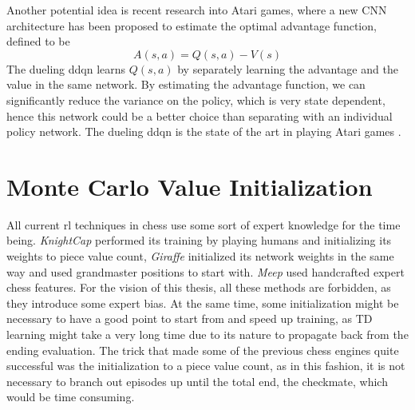 Another potential idea is recent research into Atari games, where a new CNN architecture has been proposed to estimate the optimal advantage function, defined to be
\begin{equation}
A(s,a)=Q(s,a)-V(s)
\end{equation}
The dueling \gls{ddqn} learns $Q(s,a)$ by separately learning the advantage and the value in the same network. By estimating the advantage function, we can significantly reduce the variance on the policy, which is very state dependent, hence this network could be a better choice than separating with an individual policy network. The dueling \gls{ddqn} is the state of the art in playing Atari games \cite{dddqn15}.

\section{Monte Carlo Value Initialization}

All current \gls{rl} techniques in chess use some sort of expert knowledge for the time being. \textit{KnightCap} performed its training by playing humans and initializing its weights to piece value count, \textit{Giraffe} initialized its network weights in the same way and used grandmaster positions to start with. \textit{Meep} used handcrafted expert chess features. For the vision of this thesis, all these methods are forbidden, as they introduce some expert bias. At the same time, some initialization might be necessary to have a good point to start from and speed up training, as TD learning might take a very long time due to its nature to propagate back from the ending evaluation. The trick that made some of the previous chess engines quite successful was the initialization to a piece value count, as in this fashion, it is not necessary to branch out episodes up until the total end, the checkmate, which would be time consuming.\\


